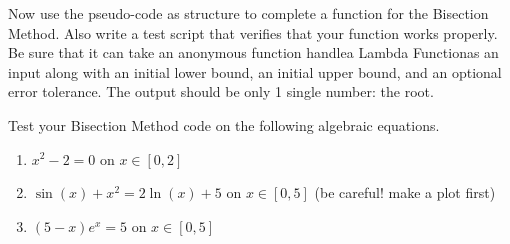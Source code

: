 \begin{problem}
    Now use the pseudo-code as structure to complete a \ProgLang function for the Bisection
    Method.  Also write a test script that verifies that your function works properly. Be
    sure that it can take \ifnum{} an anonymous function
    handle\else a Lambda Function\fi as an input along with an initial
    lower bound, an initial upper bound, and an optional error tolerance. The output
    should be only 1 single number: the root.\\
    \ifnum{}  
    \else
    \fi
\end{problem}

\begin{problem}
    Test your Bisection Method code on the following algebraic equations.
    \begin{enumerate}
        \item $x^2 - 2 = 0$ on $x \in [0,2]$ 
        \item $\sin(x) + x^2 = 2\ln(x) + 5$ on $x \in [0,5]$ (be careful! make a plot
            first) 
        \item $(5-x)e^{x}=5$ on $x \in [0,5]$
    \end{enumerate}
\end{problem}


